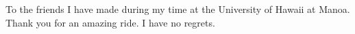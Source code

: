 
\begin{dedication}
\null\vfil
{\large
\begin{center}
To the friends I have made during my time at the University of Hawaii at Manoa. Thank you for an amazing ride. I have no regrets.
\end{center}}
\vfil\null
\end{dedication}
